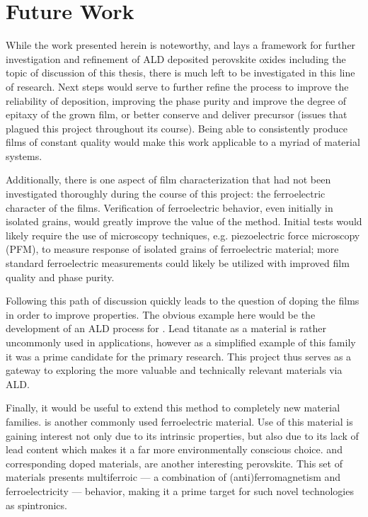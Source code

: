 
\section{Future Work}
\label{sec:Conc-Future}

While the work presented herein is noteworthy, and lays a framework for further investigation and refinement of ALD deposited perovskite oxides including the topic of discussion of this thesis, there is much left to be investigated in this line of research. Next steps would serve to further refine the process to improve the reliability of deposition, improving the phase purity and improve the degree of epitaxy of the grown film, or better conserve and deliver precursor (issues that plagued this project throughout its course). Being able to consistently produce films of constant quality would make this work applicable to a myriad of material systems. 

Additionally, there is one aspect of film characterization that had not been investigated thoroughly during the course of this project: the ferroelectric character of the films. Verification of ferroelectric behavior, even initially in isolated grains, would greatly improve the value of the method. Initial tests would likely require the use of microscopy techniques, e.g. piezoelectric force microscopy (PFM), to measure response of isolated grains of ferroelectric material; more standard ferroelectric measurements could likely be utilized with improved film quality and phase purity. 

Following this path of discussion quickly leads to the question of doping the films in order to improve properties. The obvious example here would be the development of an ALD process for . Lead titanate as a material is rather uncommonly used in applications, however as a simplified example of this family it was a prime candidate for the primary research. This project thus serves as a gateway to exploring the more valuable and technically relevant materials via ALD. 

Finally, it would be useful to extend this method to completely new material families.  is another commonly used ferroelectric material. Use of this material is gaining interest not only due to its intrinsic properties, but also due to its lack of lead content which makes it a far more environmentally conscious choice.  and corresponding doped materials, are another interesting perovskite. This set of materials presents multiferroic --- a combination of (anti)ferromagnetism and ferroelectricity --- behavior, making it a prime target for such novel technologies as spintronics. 






